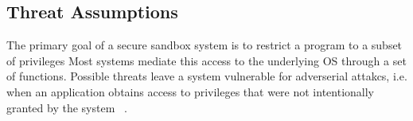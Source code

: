 

\subsection{Threat Assumptions}


The primary goal of a secure sandbox system is to restrict a program to a subset of privileges 
Most systems mediate this access to the underlying OS through a set of functions. Possible threats leave  a system vulnerable for adverserial attakcs, i.e. 
when an application obtains access to privileges that were not intentionally granted by the system ~\cite{Repy-10}.

